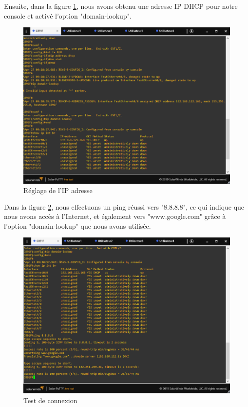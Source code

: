 Ensuite, dans la figure \ref{Chap2.2.2}, nous avons obtenu une adresse IP DHCP pour notre console et activé l'option "domain-lookup".  \\


\bigskip
\bigskip
\bigskip
\bigskip


\begin{figure}[H]
 \centering
    \includegraphics[width=16cm]{Images/BRades-Topologie2.png}
    \caption{Réglage de l'IP adresse}
    \label{Chap2.2.2}
\end{figure}

\smallskip


Dans la figure \ref{Chap2.2.3}, nous effectuons un ping réussi vers "8.8.8.8", ce qui indique que nous avons accès à l'Internet, et également vers "www.google.com" grâce à l'option "domain-lookup" que nous avons utilisée. \\

\bigskip
\bigskip
\bigskip
\bigskip

\begin{figure}[H]
 \centering
    \includegraphics[width=16cm]{Images/BRades-Topologie3.png}
    \caption{Test de connexion}
    \label{Chap2.2.3}
\end{figure}

